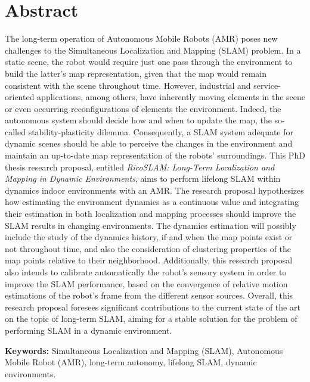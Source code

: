 \cleardoublepage

\chapter*{Abstract}

The long-term operation of Autonomous Mobile Robots (AMR) poses new challenges to the Simultaneous Localization and Mapping (SLAM) problem.
In a static scene, the robot would require just one pass through the environment to build the latter's map representation, given that the map would remain consistent with the scene throughout time. However, industrial and service-oriented applications, among others, have inherently moving elements in the scene or even occurring reconfigurations of elements the environment. Indeed, the autonomous system should decide how and when to update the map, the so-called stability-plasticity dilemma.
Consequently, a SLAM system adequate for dynamic scenes should be able to perceive the changes in the environment and maintain an up-to-date map representation of the robots' surroundings.
This PhD thesis research proposal, entitled \textit{RicoSLAM: Long-Term Localization and Mapping in Dynamic Environments}, aims to perform lifelong SLAM within dynamics indoor environments with an AMR. The research proposal hypothesizes how estimating the environment dynamics as a continuous value and integrating their estimation in both localization and mapping processes should improve the SLAM results in changing environments. The dynamics estimation will possibly include the study of the dynamics history, if and when the map points exist or not throughout time, and also the consideration of clustering properties of the map points relative to their neighborhood. Additionally, this research proposal also intends to calibrate automatically the robot's sensory system in order to improve the SLAM performance, based on the convergence of relative motion estimations of the robot's frame from the different sensor sources.
Overall, this research proposal foresees significant contributions to the current state of the art on the topic of long-term SLAM, aiming for a stable solution for the problem of performing SLAM in a dynamic environment.

\hfill\break

\textbf{Keywords:} Simultaneous Localization and Mapping (SLAM), Autonomous Mobile Robot (AMR), long-term autonomy, lifelong SLAM, dynamic environments.
